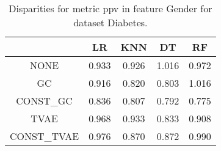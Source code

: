 \begin{table}
\caption{Disparities for metric ppv in feature Gender for dataset Diabetes.}
\label{tab:disp-DIABETES-Gender-ppv}
\begin{tabular}{ccccc}
\toprule
 & LR & KNN & DT & RF \\
\midrule
NONE & 0.933 & 0.926 & 1.016 & 0.972 \\
GC & 0.916 & 0.820 & 0.803 & 1.016 \\
CONST\_GC & 0.836 & 0.807 & 0.792 & 0.775 \\
TVAE & 0.968 & 0.933 & 0.833 & 0.908 \\
CONST\_TVAE & 0.976 & 0.870 & 0.872 & 0.990 \\
\bottomrule
\end{tabular}
\end{table}
